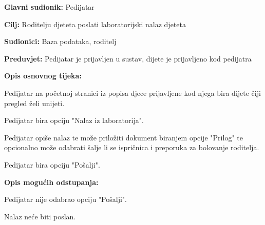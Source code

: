 					\noindent {}
					\begin{packed_item}
						
						\item \textbf{Glavni sudionik: }Pedijatar
						\item  \textbf{Cilj:} Roditelju djeteta poslati laboratorijski nalaz djeteta
						\item  \textbf{Sudionici:} Baza podataka, roditelj
						\item  \textbf{Preduvjet:} Pedijatar je prijavljen u sustav, dijete je prijavljeno kod pedijatra
						\item  \textbf{Opis osnovnog tijeka:}
						
						\item[] \begin{packed_enum}
							
							\item Pedijatar na početnoj stranici iz popisa djece prijavljene kod njega bira dijete čiji pregled želi unijeti.
							\item Pedijatar bira opciju "Nalaz iz laboratorija".
							\item Pedijatar opiše nalaz te može priložiti dokument biranjem opcije "Prilog" te opcionalno može odabrati šalje li se ispričnica i preporuka za bolovanje roditelja.
							\item Pedijatar bira opciju "Pošalji".
						\end{packed_enum}
						
						\item  \textbf{Opis mogućih odstupanja:}
						
						\item[] \begin{packed_item}
							
							\item[4.a] Pedijatar nije odabrao opciju "Pošalji".
							\item[] \begin{packed_enum}
								
								\item Nalaz neće biti poslan.
							\end{packed_enum}
							
							
						\end{packed_item}
						
						
					\end{packed_item}
					
